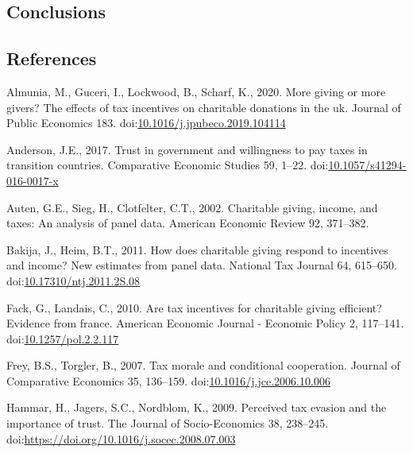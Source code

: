 \documentclass[ review  , 3p ]{elsarticle}
\begin{document}
  \hypertarget{conclusions-1}{%
  \subsection{Conclusions}\label{conclusions-1}}
  
  \clearpage
  
  \hypertarget{references}{%
  \subsection*{References}\label{references}}
  
  \hypertarget{refs}{}
  \leavevmode\hypertarget{ref-Almunia2020}{}%
  Almunia, M., Guceri, I., Lockwood, B., Scharf, K., 2020. More giving or more givers? The effects of tax incentives on charitable donations in the uk. Journal of Public Economics 183. doi:\href{https://doi.org/10.1016/j.jpubeco.2019.104114}{10.1016/j.jpubeco.2019.104114}
  
  \leavevmode\hypertarget{ref-Anderson2017}{}%
  Anderson, J.E., 2017. Trust in government and willingness to pay taxes in transition countries. Comparative Economic Studies 59, 1--22. doi:\href{https://doi.org/10.1057/s41294-016-0017-x}{10.1057/s41294-016-0017-x}
  
  \leavevmode\hypertarget{ref-Auten2002}{}%
  Auten, G.E., Sieg, H., Clotfelter, C.T., 2002. Charitable giving, income, and taxes: An analysis of panel data. American Economic Review 92, 371--382.
  
  \leavevmode\hypertarget{ref-Bakija2011}{}%
  Bakija, J., Heim, B.T., 2011. How does charitable giving respond to incentives and income? New estimates from panel data. National Tax Journal 64, 615--650. doi:\href{https://doi.org/10.17310/ntj.2011.2S.08}{10.17310/ntj.2011.2S.08}
  
  \leavevmode\hypertarget{ref-Fack2010}{}%
  Fack, G., Landais, C., 2010. Are tax incentives for charitable giving efficient? Evidence from france. American Economic Journal - Economic Policy 2, 117--141. doi:\href{https://doi.org/10.1257/pol.2.2.117}{10.1257/pol.2.2.117}
  
  \leavevmode\hypertarget{ref-Frey2007}{}%
  Frey, B.S., Torgler, B., 2007. Tax morale and conditional cooperation. Journal of Comparative Economics 35, 136--159. doi:\href{https://doi.org/10.1016/j.jce.2006.10.006}{10.1016/j.jce.2006.10.006}
  
  \leavevmode\hypertarget{ref-Hammar2009}{}%
  Hammar, H., Jagers, S.C., Nordblom, K., 2009. Perceived tax evasion and the importance of trust. The Journal of Socio-Economics 38, 238--245. doi:\href{https://doi.org/https://doi.org/10.1016/j.socec.2008.07.003}{https://doi.org/10.1016/j.socec.2008.07.003}
  
\end{document}
